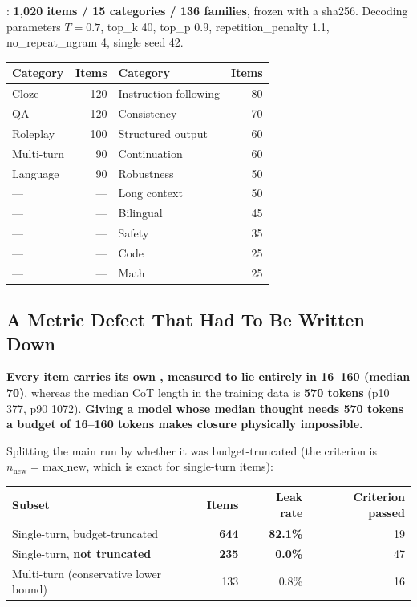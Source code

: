 : \textbf{1,020 items / 15 categories / 136 families}, frozen
with a sha256. Decoding parameters $T = 0.7$, top\_k 40, top\_p 0.9, repetition\_penalty 1.1,
no\_repeat\_ngram 4, single seed 42.

\begin{center}\small
\begin{tabular}{@{}lrlr@{}}
\toprule
\textbf{Category} & \textbf{Items} & \textbf{Category} & \textbf{Items} \\
\midrule
Cloze & 120 & Instruction following & 80 \\
QA & 120 & Consistency & 70 \\
Roleplay & 100 & Structured output & 60 \\
Multi-turn & 90 & Continuation & 60 \\
Language & 90 & Robustness & 50 \\
--- & --- & Long context & 50 \\
--- & --- & Bilingual & 45 \\
--- & --- & Safety & 35 \\
--- & --- & Code & 25 \\
--- & --- & Math & 25 \\
\bottomrule
\end{tabular}
\end{center}

\subsection{A Metric Defect That Had To Be Written Down}
\label{sec:en-eval-metric}

\textbf{Every item carries its own , measured to lie entirely in 16--160 (median
70)}, whereas the median CoT length in the training data is \textbf{570 tokens} (p10 377, p90
1072). \textbf{Giving a model whose median thought needs 570 tokens a budget of 16--160 tokens
makes closure physically impossible.}

Splitting the main run by whether it was budget-truncated (the criterion is
$n_{\text{new}} = \text{max\_new}$, which is exact for single-turn items):

\begin{center}\small
\begin{tabular}{@{}>{\RaggedRight\arraybackslash}p{}rrr@{}}
\toprule
\textbf{Subset} & \textbf{Items} & \textbf{Leak rate} & \textbf{Criterion passed} \\
\midrule
Single-turn, budget-truncated & \textbf{644} & \textbf{82.1\%} & 19 \\
Single-turn, \textbf{not truncated} & \textbf{235} & \textbf{0.0\%} & 47 \\
Multi-turn (conservative lower bound) & 133 & 0.8\% & 16 \\
\bottomrule
\end{tabular}
\end{center}

